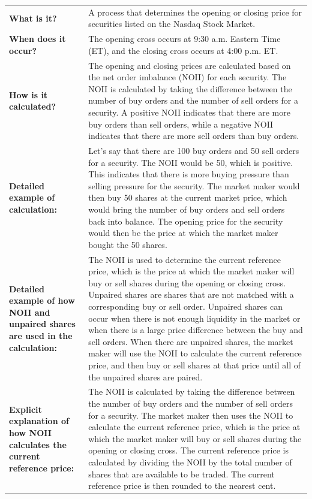 \documentclass[11pt]{article}
\begin{document}
\begin{center}
\begin{tabular}{ll}
\hline
\textbf{\textbf{What is it?}} & A process that determines the opening or closing price for securities listed on the Nasdaq Stock Market.\\[0pt]
\textbf{\textbf{When does it occur?}} & The opening cross occurs at 9:30 a.m. Eastern Time (ET), and the closing cross occurs at 4:00 p.m. ET.\\[0pt]
\textbf{\textbf{How is it calculated?}} & The opening and closing prices are calculated based on the net order imbalance (NOII) for each security. The NOII is calculated by taking the difference between the number of buy orders and the number of sell orders for a security. A positive NOII indicates that there are more buy orders than sell orders, while a negative NOII indicates that there are more sell orders than buy orders.\\[0pt]
\textbf{\textbf{Detailed example of calculation:}} & Let's say that there are 100 buy orders and 50 sell orders for a security. The NOII would be 50, which is positive. This indicates that there is more buying pressure than selling pressure for the security. The market maker would then buy 50 shares at the current market price, which would bring the number of buy orders and sell orders back into balance. The opening price for the security would then be the price at which the market maker bought the 50 shares.\\[0pt]
\textbf{\textbf{Detailed example of how NOII and unpaired shares are used in the calculation:}} & The NOII is used to determine the current reference price, which is the price at which the market maker will buy or sell shares during the opening or closing cross. Unpaired shares are shares that are not matched with a corresponding buy or sell order. Unpaired shares can occur when there is not enough liquidity in the market or when there is a large price difference between the buy and sell orders. When there are unpaired shares, the market maker will use the NOII to calculate the current reference price, and then buy or sell shares at that price until all of the unpaired shares are paired.\\[0pt]
\textbf{\textbf{Explicit explanation of how NOII calculates the current reference price:}} & The NOII is calculated by taking the difference between the number of buy orders and the number of sell orders for a security. The market maker then uses the NOII to calculate the current reference price, which is the price at which the market maker will buy or sell shares during the opening or closing cross. The current reference price is calculated by dividing the NOII by the total number of shares that are available to be traded. The current reference price is then rounded to the nearest cent.\\[0pt]

\end{tabular}
\end{center}
\end{document}
